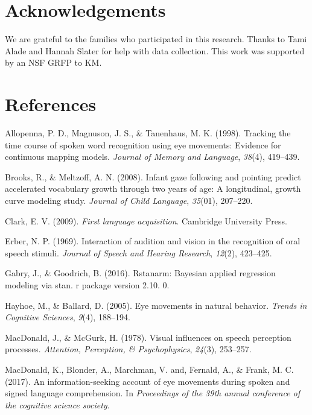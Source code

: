 \documentclass[10pt, letterpaper]{article}
\begin{document}
\section{Acknowledgements}\label{acknowledgements}

We are grateful to the families who participated in this research.
Thanks to Tami Alade and Hannah Slater for help with data collection.
This work was supported by an NSF GRFP to KM.

\section{References}\label{references}

\setlength{\parindent}{-0.1in} \setlength{\leftskip}{0.125in} \noindent

\hypertarget{refs}{}
\hypertarget{ref-allopenna1998tracking}{}
Allopenna, P. D., Magnuson, J. S., \& Tanenhaus, M. K. (1998). Tracking
the time course of spoken word recognition using eye movements: Evidence
for continuous mapping models. \emph{Journal of Memory and Language},
\emph{38}(4), 419--439.

\hypertarget{ref-brooks2008infant}{}
Brooks, R., \& Meltzoff, A. N. (2008). Infant gaze following and
pointing predict accelerated vocabulary growth through two years of age:
A longitudinal, growth curve modeling study. \emph{Journal of Child
Language}, \emph{35}(01), 207--220.

\hypertarget{ref-clark2009first}{}
Clark, E. V. (2009). \emph{First language acquisition}. Cambridge
University Press.

\hypertarget{ref-erber1969interaction}{}
Erber, N. P. (1969). Interaction of audition and vision in the
recognition of oral speech stimuli. \emph{Journal of Speech and Hearing
Research}, \emph{12}(2), 423--425.

\hypertarget{ref-gabry2016rstanarm}{}
Gabry, J., \& Goodrich, B. (2016). Rstanarm: Bayesian applied regression
modeling via stan. r package version 2.10. 0.

\hypertarget{ref-hayhoe2005eye}{}
Hayhoe, M., \& Ballard, D. (2005). Eye movements in natural behavior.
\emph{Trends in Cognitive Sciences}, \emph{9}(4), 188--194.

\hypertarget{ref-macdonald1978visual}{}
MacDonald, J., \& McGurk, H. (1978). Visual influences on speech
perception processes. \emph{Attention, Perception, \& Psychophysics},
\emph{24}(3), 253--257.

\hypertarget{ref-macdonald2017info}{}
MacDonald, K., Blonder, A., Marchman, V. and, Fernald, A., \& Frank, M.
C. (2017). An information-seeking account of eye movements during spoken
and signed language comprehension. In \emph{Proceedings of the 39th
annual conference of the cognitive science society}.
\end{document}

